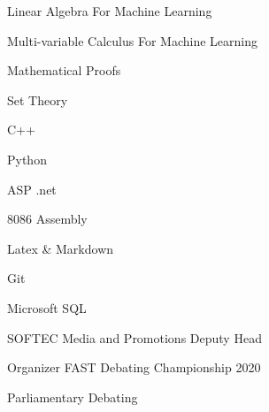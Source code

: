 \vspace{0.2mm}

\smallskip

\textbullet{} Linear Algebra For Machine Learning

\textbullet{} Multi-variable Calculus For Machine Learning

\textbullet{} Mathematical Proofs

\textbullet{} Set Theory


\smallskip

\textbullet{} C++ 

\textbullet{} Python 

\textbullet{} ASP .net 

\textbullet{} 8086 Assembly 

\textbullet{} Latex \& Markdown 

\textbullet{} Git 

\textbullet{} Microsoft SQL



\newline
{}\newline
{}\newline
{}\newline
{}\newline
{}\newline
{}\newline
{}\newline
{}\newline
{}\newline
 \divider

\textbullet{} SOFTEC Media and Promotions Deputy Head
\newline

\textbullet{} Organizer FAST Debating Championship 2020 
\newline

\textbullet{} Parliamentary Debating
\newline



\smallskip






